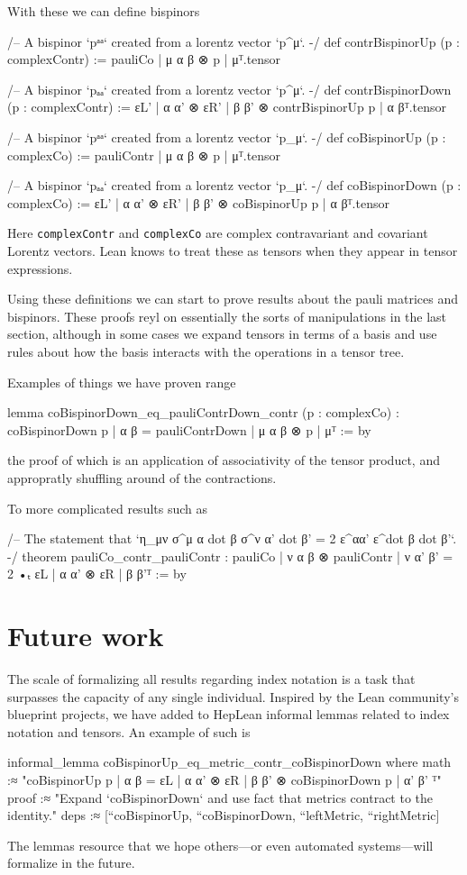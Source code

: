 \documentclass[a4paper, 11pt]{article}
\begin{document}
With these we can define bispinors 
\begin{code}
/-- A bispinor `pᵃᵃ` created from a lorentz vector `p^μ`. -/
def contrBispinorUp (p : complexContr) :=
  {pauliCo | μ α β ⊗ p | μ}ᵀ.tensor

/-- A bispinor `pₐₐ` created from a lorentz vector `p^μ`. -/
def contrBispinorDown (p : complexContr) :=
  {εL' | α α' ⊗ εR' | β β' ⊗ contrBispinorUp p | α β}ᵀ.tensor

/-- A bispinor `pᵃᵃ` created from a lorentz vector `p_μ`. -/
def coBispinorUp (p : complexCo) := {pauliContr | μ α β ⊗ p | μ}ᵀ.tensor

/-- A bispinor `pₐₐ` created from a lorentz vector `p_μ`. -/
def coBispinorDown (p : complexCo) :=
  {εL' | α α' ⊗ εR' | β β' ⊗ coBispinorUp p | α β}ᵀ.tensor
\end{code}
Here \lstinline|complexContr| and \lstinline|complexCo| are complex contravariant and covariant Lorentz vectors.
Lean knows to treat these as tensors when they appear in tensor expressions. 


Using these definitions we can start to prove results about the pauli matrices and bispinors. 
These proofs reyl on essentially the sorts of manipulations in the last section, although in some cases 
we expand tensors in terms of a basis and use rules about how the basis interacts with the operations in a tensor tree. 

Examples of things we have proven range  
\begin{code}
lemma coBispinorDown_eq_pauliContrDown_contr (p : complexCo) :
  {coBispinorDown p | α β = pauliContrDown | μ α β ⊗ p | μ}ᵀ := by
\end{code}
the proof of which is an application of associativity of the tensor product, and appropratly shuffling 
around of the contractions. 

To more complicated results such as
\begin{code}
/-- The statement that `η_{μν} σ^{μ α dot β} σ^{ν α' dot β'} = 2 ε^{αα'} ε^{dot β dot β'}`. -/
theorem pauliCo_contr_pauliContr :
    {pauliCo | ν α β ⊗ pauliContr | ν α' β' = 2 •ₜ εL | α α' ⊗ εR | β β'}ᵀ := by
\end{code}


\section{Future work} \label{sec:future}
The scale of formalizing all results regarding index notation is a task that surpasses 
the capacity of any single individual. Inspired by the Lean community's 
blueprint projects, we have added to HepLean informal lemmas related to index notation and tensors. 
An example of such is 
\begin{code} 
informal_lemma coBispinorUp_eq_metric_contr_coBispinorDown where
  math :≈ "{coBispinorUp p | α β = εL | α α' ⊗ εR | β β' ⊗ coBispinorDown p | α' β' }ᵀ"
  proof :≈ "Expand `coBispinorDown` and use fact that metrics contract to the identity."
  deps :≈ [``coBispinorUp, ``coBispinorDown, ``leftMetric, ``rightMetric]
\end{code}
The lemmas  resource that we hope others—or even automated systems—will formalize in the future.
\end{document}
